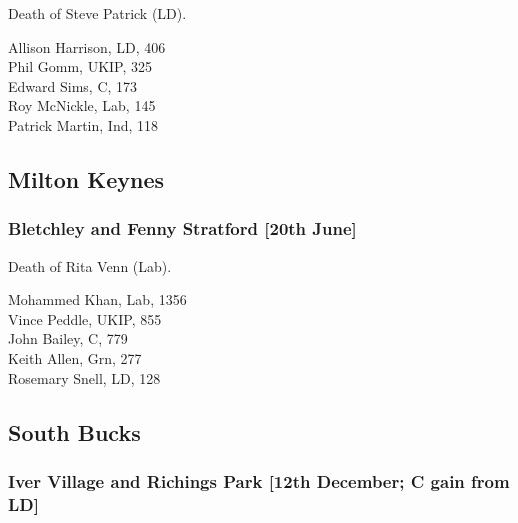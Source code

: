 \documentclass[a4paper,openany,10pt]{book}
\begin{document}

Death of Steve Patrick (LD).



Allison Harrison, LD, 406\\
Phil Gomm, UKIP, 325\\
Edward Sims, C, 173\\
Roy McNickle, Lab, 145\\
Patrick Martin, Ind, 118\\


\subsection*{Milton Keynes}

\subsubsection*{Bletchley and Fenny Stratford \hspace*{\fill}\nolinebreak[1]%
\enspace\hspace*{\fill}
[20th June]}


Death of Rita Venn (Lab).



Mohammed Khan, Lab, 1356\\
Vince Peddle, UKIP, 855\\
John Bailey, C, 779\\
Keith Allen, Grn, 277\\
Rosemary Snell, LD, 128\\


\subsection*{South Bucks}

\subsubsection*{Iver Village and Richings Park \hspace*{\fill}\nolinebreak[1]%
\enspace\hspace*{\fill}
[12th December; C gain from LD]}

\end{document}
